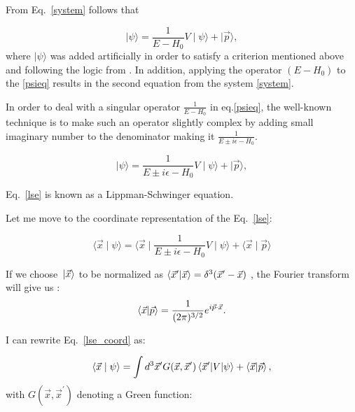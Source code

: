     From Eq.~\ref*{system} follows that

    \begin{equation}
        \mid \psi \rangle = \frac{1}{E - H_0}V \mid \psi \rangle +  \mid \vec{p} \rangle,
        \label{psieq}
    \end{equation}
    where $\mid \psi \rangle$ was added artificially in order to satisfy a criterion mentioned above 
    and following the logic from \cite{Sakurai}. In addition, applying the operator $(E -H_0)$ to the 
    \ref*{psieq} results in the second equation from the system \ref{system}.

    In order to deal with a singular operator $\frac{1}{E - H_0}$ in eq.\ref*{psieq}, the well-known
    technique is to make such an operator slightly complex by adding small imaginary number to the denominator
    making it  $\frac{1}{E \pm i\epsilon - H_0}$.

    \begin{equation}
        \mid \psi \rangle = \frac{1}{E \pm i\epsilon - H_0}V \mid \psi \rangle +  \mid \vec{p} \rangle,
        \label{lse}
    \end{equation}

    Eq.~\ref*{lse} is known as a Lippman-Schwinger equation. 
    
    Let me move to the coordinate representation of the Eq.~\ref{lse}:

    \begin{equation}
    \langle \vec{x}  \mid \psi \rangle = \langle \vec{x}  \mid \frac{1}{E \pm i\epsilon - H_0}V \mid \psi \rangle + \langle \vec{x}  \mid \vec{p} \rangle
    \label{lse_coord}
    \end{equation}

    If we choose $\ket*{\vec{x}}$ to be normalized as
    $\braket{\vec{x}^\prime}{\vec{x}} = \delta^3(\vec{x}^\prime - \vec{x})$ ,
    the Fourier transform will give us \cite{elster_lectures}: 
    \begin{equation}
        \braket{\vec{x}}{\vec{p}} = \frac{1}{(2 \pi)^{3/2}} e^{i \vec{p} \cdot \vec{x}}.
        \label{planewave}
    \end{equation}

    I can rewrite Eq.~\ref{lse_coord} as:


    \begin{equation}
        \langle \vec{x}  \mid \psi \rangle = \int d^3 \vec{x}^\prime G(\vec{x}, \vec{x}^\prime) 
        \matrixel{\vec{x}^\prime}{V} {\psi} + \braket{\vec{x}}{\vec{p}},
        \label{lse_green}
    \end{equation}
    with $G(\vec{x}, \vec{x}^\prime)$ denoting a Green function:

